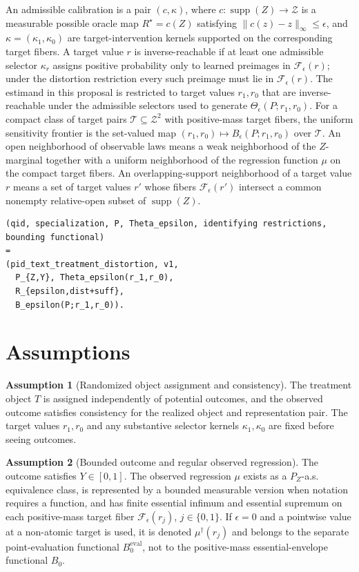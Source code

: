 \documentclass[11pt]{article}
\theoremstyle{definition}
\newtheorem{assumption}{Assumption}
\theoremstyle{plain}
\theoremstyle{remark}
\begin{document}
An admissible calibration is a pair \((c,\kappa)\), where \(c:\operatorname{supp}(Z)\to\mathcal Z\) is a measurable possible oracle map \(R^\star=c(Z)\) satisfying \(\|c(z)-z\|_\infty\le\epsilon\), and \(\kappa=(\kappa_1,\kappa_0)\) are target-intervention kernels supported on the corresponding target fibers.  A target value \(r\) is inverse-reachable if at least one admissible selector \(\kappa_r\) assigns positive probability only to learned preimages in \(\mathcal F_\epsilon(r)\); under the distortion restriction every such preimage must lie in \(\mathcal F_\epsilon(r)\).  The estimand in this proposal is restricted to target values \(r_1,r_0\) that are inverse-reachable under the admissible selectors used to generate \(\Theta_\epsilon(P;r_1,r_0)\).  For a compact class of target pairs \(\mathcal T\subseteq\mathcal Z^2\) with positive-mass target fibers, the uniform sensitivity frontier is the set-valued map \((r_1,r_0)\mapsto B_\epsilon(P;r_1,r_0)\) over \(\mathcal T\).
An open neighborhood of observable laws means a weak neighborhood of the \(Z\)-marginal together with a uniform neighborhood of the regression function \(\mu\) on the compact target fibers.  An overlapping-support neighborhood of a target value \(r\) means a set of target values \(r'\) whose fibers \(\mathcal F_\epsilon(r')\) intersect a common nonempty relative-open subset of \(\operatorname{supp}(Z)\).

\begin{verbatim}
(qid, specialization, P, Theta_epsilon, identifying restrictions, bounding functional)
=
(pid_text_treatment_distortion, v1,
  P_{Z,Y}, Theta_epsilon(r_1,r_0),
  R_{epsilon,dist+suff},
  B_epsilon(P;r_1,r_0)).
\end{verbatim}

\section{Assumptions}
\begin{assumption}[Randomized object assignment and consistency]\label{ass:randomized-consistency}
The treatment object \(T\) is assigned independently of potential outcomes, and the observed outcome satisfies consistency for the realized object and representation pair.  The target values \(r_1,r_0\) and any substantive selector kernels \(\kappa_1,\kappa_0\) are fixed before seeing outcomes.
\end{assumption}

\begin{assumption}[Bounded outcome and regular observed regression]\label{ass:bounded-regular}
The outcome satisfies \(Y\in[0,1]\).  The observed regression \(\mu\) exists as a \(P_Z\)-a.s. equivalence class, is represented by a bounded measurable version when notation requires a function, and has finite essential infimum and essential supremum on each positive-mass target fiber \(\mathcal F_\epsilon(r_j)\), \(j\in\{0,1\}\).  If \(\epsilon=0\) and a pointwise value at a non-atomic target is used, it is denoted \(\mu^\dagger(r_j)\) and belongs to the separate point-evaluation functional \(B^{\mathrm{eval}}_0\), not to the positive-mass essential-envelope functional \(B_0\).
\end{assumption}
\end{document}
